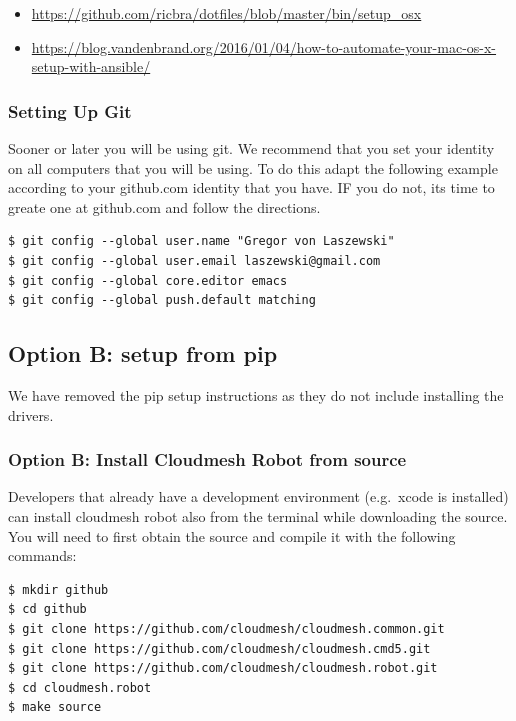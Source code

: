 \begin{itemize}
\tightlist
\item
  \url{https://github.com/ricbra/dotfiles/blob/master/bin/setup_osx}
\item
  \url{https://blog.vandenbrand.org/2016/01/04/how-to-automate-your-mac-os-x-setup-with-ansible/}
\end{itemize}

\subsubsection{Setting Up Git}\label{setting-up-git}

Sooner or later you will be using git. We recommend that you set your
identity on all computers that you will be using. To do this adapt the
following example according to your github.com identity that you have.
IF you do not, its time to greate one at github.com and follow the
directions.

\begin{verbatim}
$ git config --global user.name "Gregor von Laszewski"
$ git config --global user.email laszewski@gmail.com
$ git config --global core.editor emacs
$ git config --global push.default matching
\end{verbatim}

\subsection{Option B: setup from pip}\label{option-b-setup-from-pip}

We have removed the pip setup instructions as they do not include
installing the drivers.

\subsubsection{Option B: Install Cloudmesh Robot from
source}\label{option-b-install-cloudmesh-robot-from-source}

Developers that already have a development environment (e.g.~xcode is
installed) can install cloudmesh robot also from the terminal while
downloading the source. You will need to first obtain the source and
compile it with the following commands:

\begin{verbatim}
$ mkdir github
$ cd github
$ git clone https://github.com/cloudmesh/cloudmesh.common.git
$ git clone https://github.com/cloudmesh/cloudmesh.cmd5.git
$ git clone https://github.com/cloudmesh/cloudmesh.robot.git
$ cd cloudmesh.robot
$ make source
\end{verbatim}

